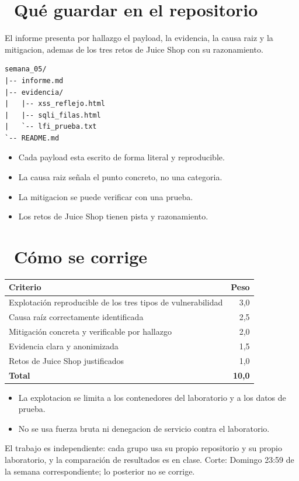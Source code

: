 \documentclass[11pt,a4paper]{article}
\newcommand{\iconotexto}[2]{\textcolor{cyanNeon}{\faIcon{#1}}~#2}
\begin{document}
\section{\iconotexto{box-open}{Qué guardar en el repositorio}}

El informe presenta por hallazgo el payload, la evidencia, la causa raiz y la mitigacion, ademas de los tres retos de Juice Shop con su razonamiento.

\begin{lstlisting}[style=estiloCodigo]
semana_05/
|-- informe.md
|-- evidencia/
|   |-- xss_reflejo.html
|   |-- sqli_filas.html
|   `-- lfi_prueba.txt
`-- README.md
\end{lstlisting}

\begin{itemize}[leftmargin=1.4em,itemsep=2pt,topsep=3pt]
  \item Cada payload esta escrito de forma literal y reproducible.
  \item La causa raiz señala el punto concreto, no una categoria.
  \item La mitigacion se puede verificar con una prueba.
  \item Los retos de Juice Shop tienen pista y razonamiento.
\end{itemize}

\section{\iconotexto{ruler-combined}{Cómo se corrige}}

\begin{tabularx}{\linewidth}{@{}X r@{}}
\toprule
Criterio & Peso\\
\midrule
Explotación reproducible de los tres tipos de vulnerabilidad & 3,0 \\
Causa raíz correctamente identificada & 2,5 \\
Mitigación concreta y verificable por hallazgo & 2,0 \\
Evidencia clara y anonimizada & 1,5 \\
Retos de Juice Shop justificados & 1,0 \\
\midrule
\textbf{Total} & \textbf{10,0}\\
\bottomrule
\end{tabularx}

\begin{itemize}[leftmargin=1.4em,itemsep=2pt,topsep=3pt]
  \item La explotacion se limita a los contenedores del laboratorio y a los datos de prueba.
  \item No se usa fuerza bruta ni denegacion de servicio contra el laboratorio.
\end{itemize}

\begin{cajaRecuerda}El trabajo es independiente: cada grupo usa su propio repositorio y su propio laboratorio, y la comparación de resultados es en clase. Corte: Domingo 23:59 de la semana correspondiente; lo posterior no se corrige.
\end{cajaRecuerda}
\end{document}
